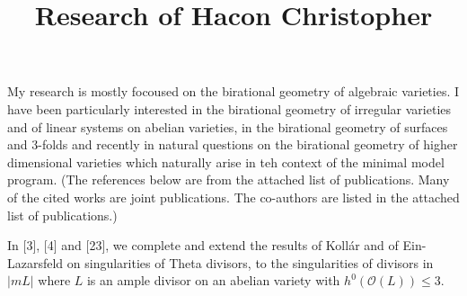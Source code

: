 \documentclass[12pt] {amsart}
\newcommand{\OO}{{\mathcal {O}}}
\begin{document}
\title{Research of Hacon Christopher}
\maketitle

My research is mostly focoused on the birational geometry of algebraic varieties. I have been particularly interested in the birational geometry of irregular varieties and of linear systems on abelian varieties, in the birational geometry of surfaces and 3-folds and recently in natural questions on the birational geometry of higher dimensional varieties which naturally arise in teh context of the minimal model program. (The references below are from the attached list of publications. Many of the cited works are joint publications. The co-authors are listed in the attached list of publications.)

\bigskip
{} In [3], [4] and [23], we complete and extend the results of Koll\'ar and of Ein-Lazarsfeld on singularities of Theta divisors, to the singularities of divisors in $|mL|$ where $L$ is an ample divisor on an abelian variety with $h^0(\OO (L))\leq 3$.
 

\bigskip
{}
 
\end{document}
